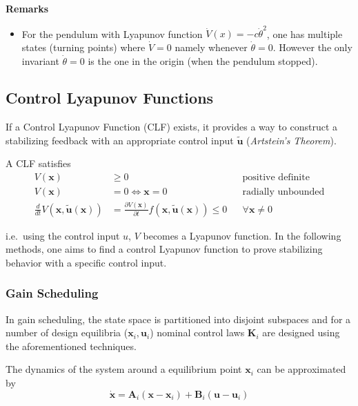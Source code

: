 \newpar{}
\textbf{Remarks}
\begin{itemize}
    \item For the pendulum with Lyapunov function $\dot{V}(x)=-c\dot{\theta}^2$, one has multiple states (turning points) where $\dot{V}=0$ namely whenever $\dot{\theta}=0$. However the only invariant $\dot{\theta}=0$ is the one in the origin (when the pendulum stopped).
\end{itemize}



\subsection{Control Lyapunov Functions}
If a Control Lyapunov Function (CLF) exists, it provides a way to construct a stabilizing feedback with an appropriate control input $\tilde{\mathbf{u}}$ (\textit{Artstein's Theorem}).

\newpar{}
A CLF satisfies
\noindent\begin{align*}
    V(\mathbf{x})                                              & \geq 0                                                                                           &  & \text{positive definite}  \\
    V(\mathbf{x})                                              & = 0 \Leftrightarrow \mathbf{x} = 0                                                               &  & \text{radially unbounded} \\
    \frac{d}{dt} V(\mathbf{x}, \tilde{\mathbf{u}}(\mathbf{x})) & = \frac{\partial V(\mathbf{x})}{\partial t} f(\mathbf{x}, \tilde{\mathbf{u}}(\mathbf{x})) \leq 0 &  & \forall \mathbf{x}\neq 0
\end{align*}

i.e.\ using the control input $u$, $V$ becomes a Lyapunov function. In the following methods, one aims to find a control Lyapunov function to prove stabilizing behavior with a specific control input.

\subsubsection{Gain Scheduling}
In gain scheduling, the state space is partitioned into disjoint subspaces and for a number of design equilibria ($\mathbf{x}_i, \mathbf{u}_i$)  nominal control laws $\mathbf{K}_i$ are designed using the aforementioned techniques.

\newpar{}
The dynamics of the system around a equilibrium point $\mathbf{x}_i$ can be approximated by
\noindent\begin{equation*}
    \dot{\mathbf{x}} = \mathbf{A}_i(\mathbf{x}-\mathbf{x}_i) + \mathbf{B}_i(\mathbf{u}-\mathbf{u}_i)
\end{equation*}

